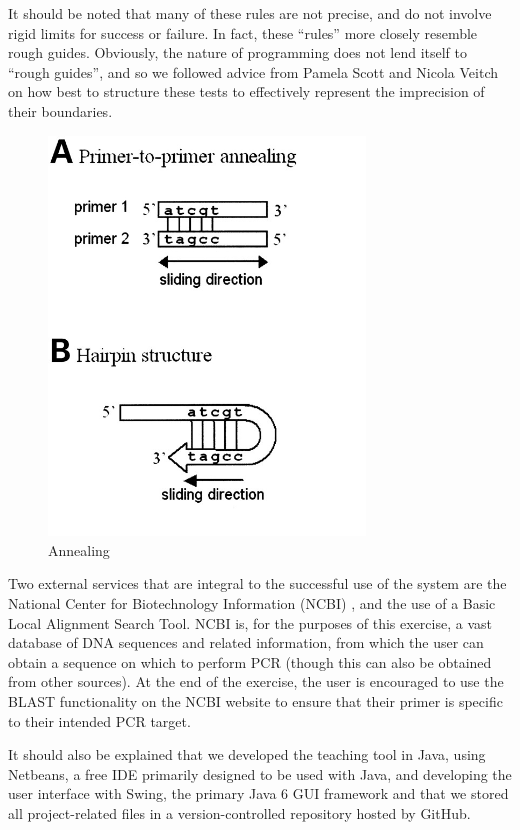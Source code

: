 It should be noted that many of these rules are not precise, and do
not involve rigid limits for success or failure.
In fact, these ``rules'' more closely resemble rough guides.
Obviously, the nature of programming does not lend itself to ``rough
guides'', and so we followed advice from Pamela Scott and Nicola
Veitch on how best to structure these tests to effectively represent
the imprecision of their boundaries.


\begin{figure}[!t]
  \begin{center}
    \includegraphics[width=0.75\textwidth]{./images/other/annealing.jpg}
    \caption{
      \label{fig:other:anneal}
      Annealing	
    }
  \end{center}
\end{figure}









Two external services that are integral to the successful use of the system
are the National Center for Biotechnology Information (NCBI) \cite{ncbi},
and the use of a Basic Local Alignment Search Tool. NCBI is, for the purposes
of this exercise, a vast database of DNA sequences and related information,
from which the user can obtain a sequence on which to perform PCR (though this
can also be obtained from other sources). At the end of the exercise, the
user is encouraged to use the BLAST functionality on the NCBI website to ensure
that their primer is specific to their intended PCR target.

It should also be explained that we developed the teaching tool
in Java, using Netbeans, a free IDE primarily designed to be used with
Java, and developing the user interface with Swing, the primary Java 6
GUI framework and that we stored all project-related files in a
version-controlled repository hosted by GitHub.

